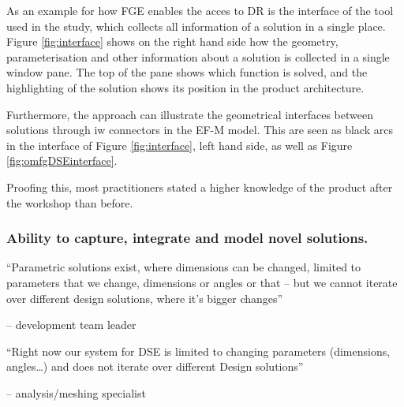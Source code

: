 \documentclass[preprints,article,accept,moreauthors,pdftex]{Definitions/mdpi}
\begin{document}
As an example for how \ac{FGE} enables the acces to \ac{DR} is the interface of the tool used in the study, which collects all information of a solution in a single place.
Figure \ref{fig:interface} shows on the right hand side how the geometry, parameterisation and other information about a solution is collected in a single window pane.
The top of the pane shows which function is solved, and the highlighting of the solution shows its position in the product architecture.

Furthermore, the approach can illustrate the geometrical interfaces between solutions through \ac{iw} connectors in the \ac{EF-M} model.
This are seen as black arcs in the interface of Figure \ref{fig:interface}, left hand side, as well as Figure \ref{fig:omfgDSEinterface}.

Proofing this, most practitioners stated a higher knowledge of the product after the workshop than before.




\subsubsection{Ability to capture, integrate and model novel solutions. }

\begin{center}
    “Parametric solutions exist, where dimensions can be changed, limited to parameters that we change, dimensions or angles or that – but we cannot iterate over different design solutions, where it’s bigger changes” 
\end{center}
\begin{flushright}
    -- development team leader
\end{flushright}

\begin{center}
    “Right now our system for DSE is limited to changing parameters (dimensions, angles…) and does not iterate over different Design solutions” 
\end{center}
\begin{flushright}
    -- analysis/meshing specialist
\end{flushright}
\end{document}
